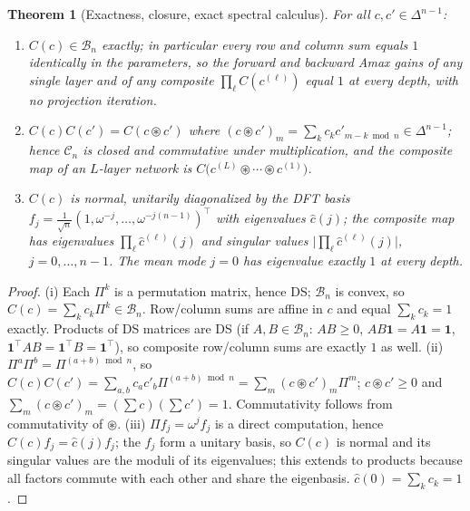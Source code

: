 \documentclass[11pt]{article}
\newtheorem{theorem}{Theorem}
\newcommand{\ones}{\mathbf{1}}
\begin{document}
\begin{theorem}[Exactness, closure, exact spectral calculus]
\label{thm:circ}
For all $c,c'\in\Delta^{n-1}$:
\begin{enumerate}
\item[(i)] $C(c)\in\mathcal{B}_n$ exactly; in particular every row and column sum equals $1$ identically in the parameters, so the forward and backward Amax gains of any single layer and of any composite $\prod_\ell C(c^{(\ell)})$ equal $1$ at every depth, with no projection iteration.
\item[(ii)] $C(c)C(c')=C(c\circledast c')$ where $(c\circledast c')_m=\sum_k c_k c'_{m-k \bmod n}\in\Delta^{n-1}$; hence $\mathcal{C}_n$ is closed and commutative under multiplication, and the composite map of an $L$-layer network is $C\big(c^{(L)}\circledast\cdots\circledast c^{(1)}\big)$.
\item[(iii)] $C(c)$ is normal, unitarily diagonalized by the DFT basis $f_j=\tfrac1{\sqrt n}(1,\omega^{-j},\dots,\omega^{-j(n-1)})^{\!\top}$ with eigenvalues $\hat c(j)$; the composite map has eigenvalues $\prod_{\ell}\hat c^{(\ell)}(j)$ and singular values $\big|\prod_\ell\hat c^{(\ell)}(j)\big|$, $j=0,\dots,n-1$. The mean mode $j=0$ has eigenvalue exactly $1$ at every depth.
\end{enumerate}
\end{theorem}
\begin{proof}
(i) Each $\Pi^k$ is a permutation matrix, hence DS; $\mathcal{B}_n$ is convex, so $C(c)=\sum_kc_k\Pi^k\in\mathcal{B}_n$. Row/column sums are affine in $c$ and equal $\sum_kc_k=1$ exactly. Products of DS matrices are DS (if $A,B\in\mathcal B_n$: $AB\ge0$, $AB\ones=A\ones=\ones$, $\ones^{\!\top}AB=\ones^{\!\top}B=\ones^{\!\top}$), so composite row/column sums are exactly $1$ as well.
(ii) $\Pi^a\Pi^b=\Pi^{(a+b)\bmod n}$, so $C(c)C(c')=\sum_{a,b}c_ac'_b\Pi^{(a+b)\bmod n}=\sum_m(c\circledast c')_m\Pi^m$; $c\circledast c'\ge0$ and $\sum_m(c\circledast c')_m=(\sum c)(\sum c')=1$. Commutativity follows from commutativity of $\circledast$.
(iii) $\Pi f_j=\omega^{j}f_j$ is a direct computation, hence $C(c)f_j=\hat c(j)f_j$; the $f_j$ form a unitary basis, so $C(c)$ is normal and its singular values are the moduli of its eigenvalues; this extends to products because all factors commute with each other and share the eigenbasis. $\hat c(0)=\sum_kc_k=1$.
\end{proof}
\end{document}
